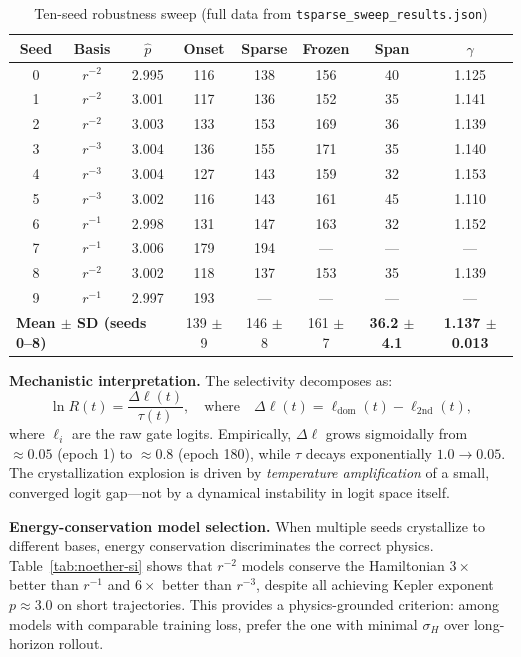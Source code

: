 \documentclass[aps,pre,reprint,superscriptaddress]{revtex4-2}
\begin{document}
\begin{table}[!ht]
\centering
\caption{Ten-seed robustness sweep (full data from \texttt{tsparse\_sweep\_results.json})}
\label{tab:tsparse-si}
\small
\begin{tabular}{cccccccc}
\hline
Seed & Basis & $\hat{p}$ & Onset & Sparse & Frozen & Span & $\gamma$ \\
\hline
0 & $r^{-2}$ & 2.995 & 116 & 138 & 156 & 40 & 1.125 \\
1 & $r^{-2}$ & 3.001 & 117 & 136 & 152 & 35 & 1.141 \\
2 & $r^{-2}$ & 3.003 & 133 & 153 & 169 & 36 & 1.139 \\
3 & $r^{-3}$ & 3.004 & 136 & 155 & 171 & 35 & 1.140 \\
4 & $r^{-3}$ & 3.004 & 127 & 143 & 159 & 32 & 1.153 \\
5 & $r^{-3}$ & 3.002 & 116 & 143 & 161 & 45 & 1.110 \\
6 & $r^{-1}$ & 2.998 & 131 & 147 & 163 & 32 & 1.152 \\
7 & $r^{-1}$ & 3.006 & 179 & 194 & --- & --- & --- \\
8 & $r^{-2}$ & 3.002 & 118 & 137 & 153 & 35 & 1.139 \\
9 & $r^{-1}$ & 2.997 & 193 & --- & --- & --- & --- \\
\hline
\multicolumn{3}{l}{\textbf{Mean $\pm$ SD (seeds 0--8)}} & 139 $\pm$ 9 & 146 $\pm$ 8 & 161 $\pm$ 7 & \textbf{36.2 $\pm$ 4.1} & \textbf{1.137 $\pm$ 0.013} \\
\hline
\end{tabular}
\end{table}

\textbf{Mechanistic interpretation.} The selectivity decomposes as:
\begin{equation}
\ln R(t) = \frac{\Delta \ell(t)}{\tau(t)}, \quad \text{where} \quad \Delta \ell(t) = \ell_{\text{dom}}(t) - \ell_{\text{2nd}}(t),
\end{equation}
where $\ell_i$ are the raw gate logits. Empirically, $\Delta \ell$ grows sigmoidally from $\approx 0.05$ (epoch 1) to $\approx 0.8$ (epoch 180), while $\tau$ decays exponentially $1.0 \to 0.05$. The crystallization explosion is driven by \textit{temperature amplification} of a small, converged logit gap---not by a dynamical instability in logit space itself.

\textbf{Energy-conservation model selection.} When multiple seeds crystallize to different bases, energy conservation discriminates the correct physics. Table~\ref{tab:noether-si} shows that $r^{-2}$ models conserve the Hamiltonian $3\times$ better than $r^{-1}$ and $6\times$ better than $r^{-3}$, despite all achieving Kepler exponent $p \approx 3.0$ on short trajectories. This provides a physics-grounded criterion: among models with comparable training loss, prefer the one with minimal $\sigma_H$ over long-horizon rollout.
\end{document}
